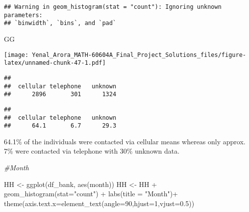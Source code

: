 \documentclass[
]{article}
\newenvironment{Shaded}{\begin{snugshade}}{\end{snugshade}}
\newcommand{\AttributeTok}[1]{\textcolor[rgb]{0.77,0.63,0.00}{#1}}
\newcommand{\CommentTok}[1]{\textcolor[rgb]{0.56,0.35,0.01}{\textit{#1}}}
\newcommand{\DecValTok}[1]{\textcolor[rgb]{0.00,0.00,0.81}{#1}}
\newcommand{\FloatTok}[1]{\textcolor[rgb]{0.00,0.00,0.81}{#1}}
\newcommand{\FunctionTok}[1]{\textcolor[rgb]{0.00,0.00,0.00}{#1}}
\newcommand{\NormalTok}[1]{#1}
\newcommand{\OtherTok}[1]{\textcolor[rgb]{0.56,0.35,0.01}{#1}}
\newcommand{\SpecialCharTok}[1]{\textcolor[rgb]{0.00,0.00,0.00}{#1}}
\newcommand{\StringTok}[1]{\textcolor[rgb]{0.31,0.60,0.02}{#1}}
\begin{document}
\begin{verbatim}
## Warning in geom_histogram(stat = "count"): Ignoring unknown parameters:
## `binwidth`, `bins`, and `pad`
\end{verbatim}

\begin{Shaded}
\begin{Highlighting}[]
\NormalTok{GG}
\end{Highlighting}
\end{Shaded}

\texttt{[image: Yenal\_Arora\_MATH-60604A\_Final\_Project\_Solutions\_files/figure-latex/unnamed-chunk-47-1.pdf]}

\begin{Shaded}
\end{Shaded}

\begin{verbatim}
## 
##  cellular telephone   unknown 
##      2896       301      1324
\end{verbatim}

\begin{Shaded}
\end{Shaded}

\begin{verbatim}
## 
##  cellular telephone   unknown 
##      64.1       6.7      29.3
\end{verbatim}

64.1\% of the individuals were contacted via cellular means whereas only
approx. 7\% were contacted via telephone with 30\% unknown data.

\begin{Shaded}
\begin{Highlighting}[]
\CommentTok{\#Month}

\NormalTok{HH }\OtherTok{\textless{}{-}} \FunctionTok{ggplot}\NormalTok{(df\_bank, }\FunctionTok{aes}\NormalTok{(month))}
\NormalTok{HH }\OtherTok{\textless{}{-}}\NormalTok{ HH }\SpecialCharTok{+} \FunctionTok{geom\_histogram}\NormalTok{(}\AttributeTok{stat=}\StringTok{"count"}\NormalTok{) }\SpecialCharTok{+} \FunctionTok{labs}\NormalTok{(}\AttributeTok{title =} \StringTok{"Month"}\NormalTok{)}\SpecialCharTok{+}
  \FunctionTok{theme}\NormalTok{(}\AttributeTok{axis.text.x=}\FunctionTok{element\_text}\NormalTok{(}\AttributeTok{angle=}\DecValTok{90}\NormalTok{,}\AttributeTok{hjust=}\DecValTok{1}\NormalTok{,}\AttributeTok{vjust=}\FloatTok{0.5}\NormalTok{))}
\end{Highlighting}
\end{Shaded}
\end{document}
